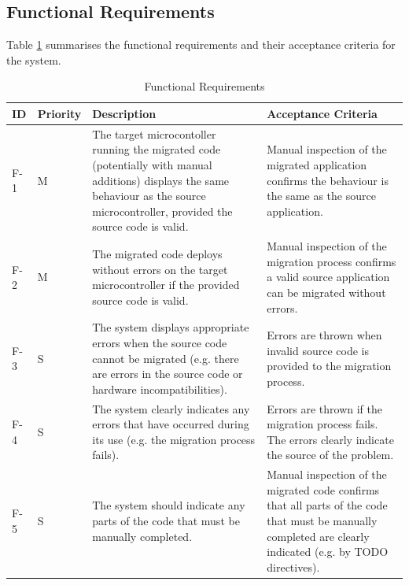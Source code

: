 \documentclass{UoYCSproject}
\newcommand{\ra}[1]{\renewcommand{\arraystretch}{#1}}
\begin{document}
\subsection{Functional Requirements}
Table \ref{table:func_req} summarises the functional requirements and their acceptance criteria for the system.
\begin{table}[h!]\centering
\ra{1.3}
  \begin{tabular}{@{}p{}p{}p{}p{}@{}} \toprule 
  \textbf{ID} & \textbf{Priority} & \textbf{Description} & \textbf{Acceptance Criteria} \\
  \midrule
  F-1 & M & The target microcontoller running the migrated code (potentially with manual additions) displays the same behaviour as the source microcontroller, provided the source code is valid. & Manual inspection of the migrated application confirms the behaviour is the same as the source application. \\
  F-2 & M & The migrated code deploys without errors on the target microcontroller if the provided source code is valid. & Manual inspection of the migration process confirms a valid source application can be migrated without errors. \\
  F-3 & S & The system displays appropriate errors when the source code cannot be migrated (e.g. there are errors in the source code or hardware incompatibilities). & Errors are thrown when invalid source code is provided to the migration process. \\  
  F-4 & S & The system clearly indicates any errors that have occurred during its use (e.g. the migration process fails). & Errors are thrown if the migration process fails. The errors clearly indicate the source of the problem. \\
  F-5 & S & The system should indicate any parts of the code that must be manually completed. & Manual inspection of the migrated code confirms that all parts of the code that must be manually completed are clearly indicated (e.g. by TODO directives). \\
  \bottomrule
  \end{tabular}
\caption{Functional Requirements}
\label{table:func_req}
\end{table}
\end{document}
